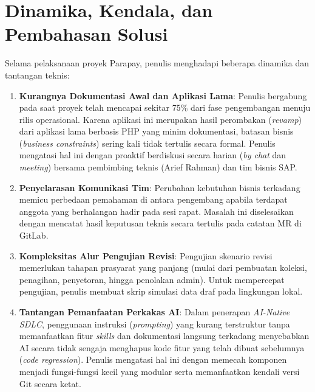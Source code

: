 \section{Dinamika, Kendala, dan Pembahasan Solusi}
Selama pelaksanaan proyek Parapay, penulis menghadapi beberapa dinamika dan tantangan teknis:

\begin{enumerate}[label=\arabic*)]
  \item \textbf{Kurangnya Dokumentasi Awal dan Aplikasi Lama}: Penulis bergabung pada saat proyek telah mencapai sekitar 75\% dari fase pengembangan menuju rilis operasional. Karena aplikasi ini merupakan hasil perombakan (\textit{revamp}) dari aplikasi lama berbasis PHP yang minim dokumentasi, batasan bisnis (\textit{business constraints}) sering kali tidak tertulis secara formal. Penulis mengatasi hal ini dengan proaktif berdiskusi secara harian (\textit{by chat} dan \textit{meeting}) bersama pembimbing teknis (Arief Rahman) dan tim bisnis SAP.
  \item \textbf{Penyelarasan Komunikasi Tim}: Perubahan kebutuhan bisnis terkadang memicu perbedaan pemahaman di antara pengembang apabila terdapat anggota yang berhalangan hadir pada sesi rapat. Masalah ini diselesaikan dengan mencatat hasil keputusan teknis secara tertulis pada catatan MR di GitLab.
  \item \textbf{Kompleksitas Alur Pengujian Revisi}: Pengujian skenario revisi memerlukan tahapan prasyarat yang panjang (mulai dari pembuatan koleksi, penagihan, penyetoran, hingga penolakan admin). Untuk mempercepat pengujian, penulis membuat skrip simulasi data draf pada lingkungan lokal.
  \item \textbf{Tantangan Pemanfaatan Perkakas AI}: Dalam penerapan \textit{AI-Native SDLC}, penggunaan instruksi (\textit{prompting}) yang kurang terstruktur tanpa memanfaatkan fitur \textit{skills} dan dokumentasi langsung terkadang menyebabkan AI secara tidak sengaja menghapus kode fitur yang telah dibuat sebelumnya (\textit{code regression}). Penulis mengatasi hal ini dengan memecah komponen menjadi fungsi-fungsi kecil yang modular serta memanfaatkan kendali versi Git secara ketat.
\end{enumerate}
